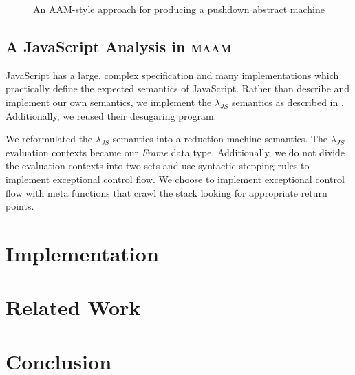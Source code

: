 \documentclass[10pt,letter,english]{article}
\newcommand{\maam}[0]{\textsc{maam}}
\newcommand{\js}[0]{JavaScript}
\newcommand{\lambdajs}[0]{$\lambda_{JS}$}
\begin{document}
\begin{figure}
\centering



\caption{An AAM-style approach for producing a pushdown abstract machine} \label{fig:M1}
\end{figure}

\subsection{A \js{} Analysis in \maam{}}

\js{} has a large, complex specification and many implementations which
practically define the expected semantics of \js{}. Rather than describe and
implement our own semantics, we implement the \lambdajs{} semantics as described
in \cite{lambdajs}. Additionally, we reused their desugaring program.

We reformulated the \lambdajs{} semantics into a reduction machine
semantics. The \lambdajs{} evaluation contexts became our \emph{Frame} data
type. Additionally, we do not divide the evaluation contexts into two sets and
use syntactic stepping rules to implement exceptional control flow. We choose to
implement exceptional control flow with meta functions that crawl the stack
looking for appropriate return points.

\section{Implementation}



\section{Related Work}



\section{Conclusion}



{}

\end{document}

